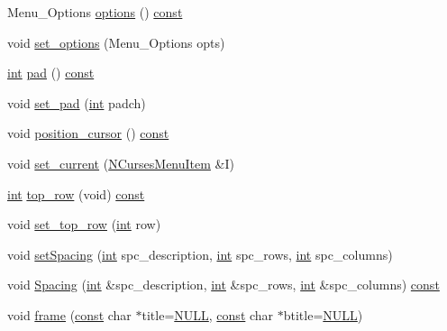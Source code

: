 \begin{DoxyCompactItemize}
Menu\-\_\-\-Options \hyperlink{class_n_curses_menu_a21055632426b37e3d486debad8cb5f5d}{options} () \hyperlink{term__entry_8h_a57bd63ce7f9a353488880e3de6692d5a}{const} 
\item 
void \hyperlink{class_n_curses_menu_a18906caecec03072ec50fee9cbb392fc}{set\-\_\-options} (Menu\-\_\-\-Options opts)
\item 
\hyperlink{term__entry_8h_ad65b480f8c8270356b45a9890f6499ae}{int} \hyperlink{class_n_curses_menu_afed43bafb323e26ea755bc9df5176795}{pad} () \hyperlink{term__entry_8h_a57bd63ce7f9a353488880e3de6692d5a}{const} 
\item 
void \hyperlink{class_n_curses_menu_ae7b6e403a0d0d69f7774345f2346f56c}{set\-\_\-pad} (\hyperlink{term__entry_8h_ad65b480f8c8270356b45a9890f6499ae}{int} padch)
\item 
void \hyperlink{class_n_curses_menu_a3546bab6e9b2676aaccbb21398bfa39b}{position\-\_\-cursor} () \hyperlink{term__entry_8h_a57bd63ce7f9a353488880e3de6692d5a}{const} 
\item 
void \hyperlink{class_n_curses_menu_aa98f1bfc05e2d70eb2251b6cd1f6da3a}{set\-\_\-current} (\hyperlink{class_n_curses_menu_item}{N\-Curses\-Menu\-Item} \&I)
\item 
\hyperlink{term__entry_8h_ad65b480f8c8270356b45a9890f6499ae}{int} \hyperlink{class_n_curses_menu_a82138f04f4841a916e9fcbbdd7814d87}{top\-\_\-row} (void) \hyperlink{term__entry_8h_a57bd63ce7f9a353488880e3de6692d5a}{const} 
\item 
void \hyperlink{class_n_curses_menu_a3170ecc7911e4f351605d70aef3def5a}{set\-\_\-top\-\_\-row} (\hyperlink{term__entry_8h_ad65b480f8c8270356b45a9890f6499ae}{int} row)
\item 
void \hyperlink{class_n_curses_menu_a0c16a87f64b7503df8d43ed3358dc9d5}{set\-Spacing} (\hyperlink{term__entry_8h_ad65b480f8c8270356b45a9890f6499ae}{int} spc\-\_\-description, \hyperlink{term__entry_8h_ad65b480f8c8270356b45a9890f6499ae}{int} spc\-\_\-rows, \hyperlink{term__entry_8h_ad65b480f8c8270356b45a9890f6499ae}{int} spc\-\_\-columns)
\item 
void \hyperlink{class_n_curses_menu_a4a76213c2e759daf59550d9d4da00cc8}{Spacing} (\hyperlink{term__entry_8h_ad65b480f8c8270356b45a9890f6499ae}{int} \&spc\-\_\-description, \hyperlink{term__entry_8h_ad65b480f8c8270356b45a9890f6499ae}{int} \&spc\-\_\-rows, \hyperlink{term__entry_8h_ad65b480f8c8270356b45a9890f6499ae}{int} \&spc\-\_\-columns) \hyperlink{term__entry_8h_a57bd63ce7f9a353488880e3de6692d5a}{const} 
\item 
void \hyperlink{class_n_curses_menu_a3310c4f5b3d4eaeac3a11adb046cd7cb}{frame} (\hyperlink{term__entry_8h_a57bd63ce7f9a353488880e3de6692d5a}{const} char $\ast$title=\hyperlink{internal_8h_a070d2ce7b6bb7e5c05602aa8c308d0c4}{N\-U\-L\-L}, \hyperlink{term__entry_8h_a57bd63ce7f9a353488880e3de6692d5a}{const} char $\ast$btitle=\hyperlink{internal_8h_a070d2ce7b6bb7e5c05602aa8c308d0c4}{N\-U\-L\-L})

\end{DoxyCompactItemize}
